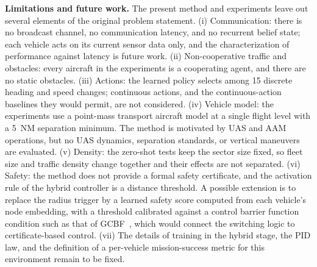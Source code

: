 \textbf{Limitations and future work.} The present method and experiments leave out several
elements of the original problem statement. (i) Communication: there is no broadcast
channel, no communication latency, and no recurrent belief state; each vehicle acts on its
current sensor data only, and the characterization of performance against latency is
future work.
(ii) Non-cooperative traffic and obstacles: every aircraft in the experiments is a
cooperating agent, and there are no static obstacles.
(iii) Actions: the learned policy selects among 15 discrete heading and speed changes;
continuous actions, and the continuous-action baselines they would permit, are not
considered.
(iv) Vehicle model: the experiments use a point-mass transport aircraft model at a single
flight level with a 5~NM separation minimum. The method is motivated by UAS and AAM
operations, but no UAS dynamics, separation standards, or vertical maneuvers are evaluated.
(v) Density: the zero-shot tests keep the sector size fixed, so fleet size and traffic
density change together and their effects are not separated. (vi) Safety: the method does
not provide a formal safety certificate, and the activation rule of the hybrid controller
is a distance threshold. A possible extension is to replace the radius trigger by a learned
safety score computed from each vehicle's node embedding, with a threshold calibrated
against a control barrier function condition such as that of GCBF~\cite{gcbf}, which would
connect the switching logic to certificate-based control.
(vii) The details of training in the hybrid stage, the PID law, and the definition of a
per-vehicle mission-success metric for this environment remain to be fixed.
